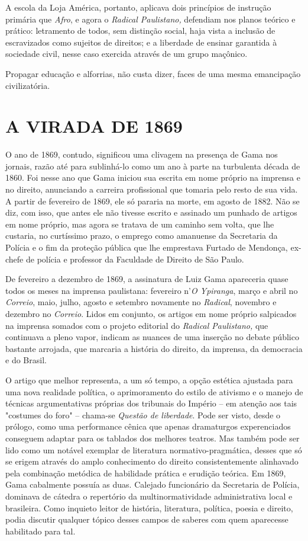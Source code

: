 A escola da Loja América, portanto, aplicava dois princípios de
instrução primária que \emph{Afro}, e agora o \emph{Radical Paulistano,}
defendiam nos planos teórico e prático: letramento de todos, sem
distinção social, haja vista a inclusão de escravizados como sujeitos de
direitos; e a liberdade de ensinar garantida à sociedade civil, nesse
caso exercida através de um grupo maçônico.

Propagar educação e alforrias, não custa dizer, faces de uma mesma
emancipação civilizatória.

\section{A VIRADA DE 1869}

O ano de 1869, contudo, significou uma clivagem na presença de Gama nos
jornais, razão até para sublinhá-lo como um ano à parte na turbulenta
década de 1860. Foi nesse ano que Gama iniciou sua escrita em nome
próprio na imprensa e no direito, anunciando a carreira profissional que
tomaria pelo resto de sua vida. A partir de fevereiro de 1869, ele só
pararia na morte, em agosto de 1882. Não se diz, com isso, que antes ele
não tivesse escrito e assinado um punhado de artigos em nome próprio,
mas agora se tratava de um caminho sem volta, que lhe custaria, no
curtíssimo prazo, o emprego como amanuense da Secretaria da Polícia e o
fim da proteção pública que lhe emprestava Furtado de Mendonça, ex-chefe
de polícia e professor da Faculdade de Direito de São Paulo.

De fevereiro a dezembro de 1869, a assinatura de Luiz Gama apareceria
quase todos os meses na imprensa paulistana: fevereiro n'\emph{O
Ypiranga}, março e abril no \emph{Correio}, maio, julho, agosto e
setembro novamente no \emph{Radical}, novembro e dezembro no
\emph{Correio}. Lidos em conjunto, os artigos em nome próprio salpicados
na imprensa somados com o projeto editorial do \emph{Radical
Paulistano,} que continuava a pleno vapor, indicam as nuances de uma
inserção no debate público bastante arrojada, que marcaria a história do
direito, da imprensa, da democracia e do Brasil.

O artigo que melhor representa, a um só tempo, a opção estética ajustada
para uma nova realidade política, o aprimoramento do estilo de ativismo
e o manejo de técnicas argumentativas próprias dos tribunais do Império
-- em atenção aos tais "costumes do foro" -- chama-se \emph{Questão de
liberdade}. Pode ser visto, desde o prólogo, como uma performance cênica
que apenas dramaturgos experenciados conseguem adaptar para os tablados
dos melhores teatros. Mas também pode ser lido como um notável exemplar
de literatura normativo-pragmática, desses que só se erigem através do
amplo conhecimento do direito consistentemente alinhavado pela
combinação metódica de habilidade prática e erudição teórica. Em 1869,
Gama cabalmente possuía as duas. Calejado funcionário da Secretaria de
Polícia, dominava de cátedra o repertório da multinormatividade
administrativa local e brasileira. Como inquieto leitor de história,
literatura, política, poesia e direito, podia discutir qualquer tópico
desses campos de saberes com quem aparecesse habilitado para tal.

